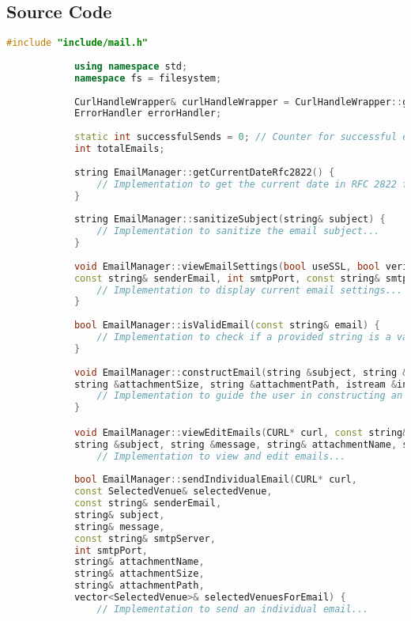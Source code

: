 \documentclass{article}
\begin{document}
	\subsection*{Source Code}
	\begin{mdframed}[backgroundcolor=background, hidealllines=false, innerleftmargin=15pt, innerrightmargin=5pt, innertopmargin=0pt, innerbottommargin=-5pt, linecolor=accent]
		\begin{lstlisting}[language=C++]
			#include "include/mail.h"
			
			using namespace std;
			namespace fs = filesystem;
			
			CurlHandleWrapper& curlHandleWrapper = CurlHandleWrapper::getInstance();
			ErrorHandler errorHandler;
			
			static int successfulSends = 0; // Counter for successful email sends
			int totalEmails;
			
			string EmailManager::getCurrentDateRfc2822() {
				// Implementation to get the current date in RFC 2822 format...
			}
			
			string EmailManager::sanitizeSubject(string& subject) {
				// Implementation to sanitize the email subject...
			}
			
			void EmailManager::viewEmailSettings(bool useSSL, bool verifyPeer, bool verifyHost, bool verbose,
			const string& senderEmail, int smtpPort, const string& smtpServer) {
				// Implementation to display current email settings...
			}
			
			bool EmailManager::isValidEmail(const string& email) {
				// Implementation to check if a provided string is a valid email format...
			}
			
			void EmailManager::constructEmail(string &subject, string &message, string &attachmentName, 
			string &attachmentSize, string &attachmentPath, istream &in) {
				// Implementation to guide the user in constructing an email...
			}

			void EmailManager::viewEditEmails(CURL* curl, const string& smtpServer, int smtpPort, vector<SelectedVenue>& selectedVenuesForEmail, const string& senderEmail, 
			string &subject, string &message, string& attachmentName, string& attachmentSize, string& attachmentPath, bool& templateExists) {
				// Implementation to view and edit emails...
				
			bool EmailManager::sendIndividualEmail(CURL* curl,
			const SelectedVenue& selectedVenue,
			const string& senderEmail,
			string& subject,
			string& message,
			const string& smtpServer,
			int smtpPort,
			string& attachmentName,
			string& attachmentSize,
			string& attachmentPath,
			vector<SelectedVenue>& selectedVenuesForEmail) {
				// Implementation to send an individual email...
			

\end{lstlisting}
\end{mdframed}
\end{document}
